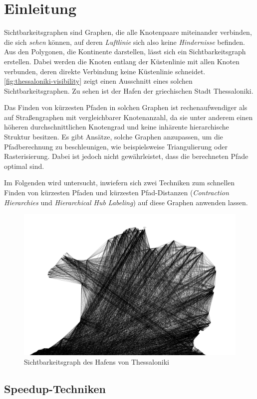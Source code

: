 \chapter{Einleitung}

Sichtbarkeitsgraphen sind Graphen, die alle Knotenpaare miteinander verbinden, die sich \emph{sehen} können, auf deren \emph{Luftlinie} sich also keine \emph{Hindernisse} befinden.
Aus den Polygonen, die Kontinente darstellen, lässt sich ein Sichtbarkeitsgraph erstellen.
Dabei werden die Knoten entlang der Küstenlinie mit allen Knoten verbunden, deren direkte Verbindung keine Küstenlinie schneidet.
\autoref{fig:thessaloniki-visibility} zeigt einen Ausschnitt eines solchen Sichtbarkeitsgraphen.
Zu sehen ist der Hafen der griechischen Stadt Thessaloniki.

Das Finden von kürzesten Pfaden in solchen Graphen ist rechenaufwendiger als auf Straßengraphen mit vergleichbarer Knotenanzahl, da sie unter anderem einen höheren durchschnittlichen Knotengrad und keine inhärente hierarchische Struktur besitzen.
Es gibt Ansätze, solche Graphen anzupassen, um die Pfadberechnung zu beschleunigen, wie beispielsweise Triangulierung oder Rasterisierung.
Dabei ist jedoch nicht gewährleistet, dass die berechneten Pfade optimal sind.

Im Folgenden wird untersucht, inwiefern sich zwei Techniken zum schnellen Finden von kürzesten Pfaden und kürzesten Pfad-Distanzen (\emph{Contraction Hierarchies} und \emph{Hierarchical Hub Labeling}) auf diese Graphen anwenden lassen.

\begin{figure}[ht]%
  \centering
  \includegraphics[width=.5\linewidth]{img/thessaloniki-visibility.png}
  \caption{Sichtbarkeitsgraph des Hafens von Thessaloniki}%
  \label{fig:thessaloniki-visibility}%
\end{figure}


\section{Speedup-Techniken}

